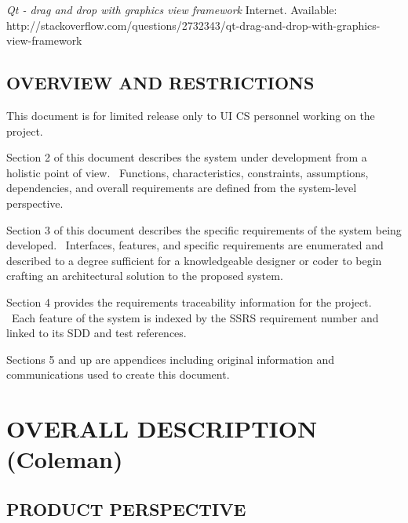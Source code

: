 \documentclass[twoside,letterpaper]{article}
\begin{document}
{{\itshape\color{black}
{Qt - drag and drop with graphics view framework} }{\color{black} Internet. Available: http://stackoverflow.com/questions/2732343/qt-drag-and-drop-with-graphics-view-framework}


\subsection[OVERVIEW AND
RESTRICTIONS]{\rmfamily\bfseries\color{black}
OVERVIEW AND RESTRICTIONS}

{\color{black}
	This document is for limited release only to UI CS personnel working on the project.}


\bigskip

{\color{black}
Section 2 of this document describes the system under development from a
holistic point of view. \ Functions, characteristics, constraints,
assumptions, dependencies, and overall requirements are defined from
the system-level perspective.}


\bigskip

{\color{black}
Section 3 of this document describes the specific requirements of the
system being developed. \ Interfaces, features, and specific
requirements are enumerated and described to a degree sufficient for a
knowledgeable designer or coder to begin crafting an architectural
solution to the proposed system.}


\bigskip

{\color{black}
Section 4 provides the requirements traceability information for the
project. \ Each feature of the system is indexed by the SSRS
requirement number and linked to its SDD and test references.}


\bigskip

{\color{black}
Sections 5 and up are appendices including original information and
communications used to create this document.}

\section[OVERALL DESCRIPTION (CKB)]{\rmfamily\bfseries\color{black}
OVERALL DESCRIPTION (Coleman)}


\subsection[PRODUCT PERSPECTIVE]{\rmfamily\bfseries\color{black}
PRODUCT PERSPECTIVE}

}
\end{document}
